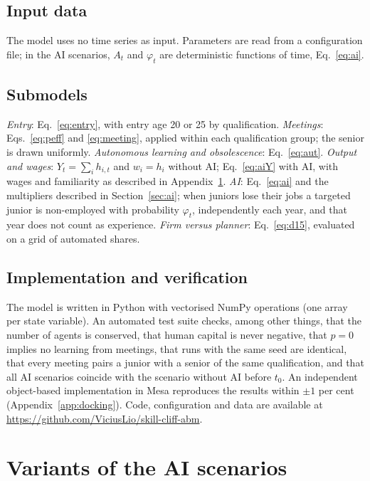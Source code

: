 \documentclass[preprint,12pt,authoryear]{elsarticle}
\begin{document}
\subsection{Input data}
The model uses no time series as input. Parameters are read from a configuration file; in the AI scenarios, $A_t$ and $\varphi_t$ are deterministic functions of time, Eq.~\eqref{eq:ai}.

\subsection{Submodels}
\emph{Entry}: Eq.~\eqref{eq:entry}, with entry age 20 or 25 by qualification. \emph{Meetings}: Eqs.~\eqref{eq:peff} and \eqref{eq:meeting}, applied within each qualification group; the senior is drawn uniformly. \emph{Autonomous learning and obsolescence}: Eq.~\eqref{eq:aut}. \emph{Output and wages}: $Y_t=\sum_i h_{i,t}$ and $w_i=h_i$ without AI; Eq.~\eqref{eq:aiY} with AI, with wages and familiarity as described in Appendix~\ref{app:variants}. \emph{AI}: Eq.~\eqref{eq:ai} and the multipliers described in Section~\ref{sec:ai}; when juniors lose their jobs a targeted junior is non-employed with probability $\varphi_t$, independently each year, and that year does not count as experience. \emph{Firm versus planner}: Eq.~\eqref{eq:d15}, evaluated on a grid of automated shares.

\subsection{Implementation and verification}
The model is written in Python with vectorised NumPy operations (one array per state variable). An automated test suite checks, among other things, that the number of agents is conserved, that human capital is never negative, that $p=0$ implies no learning from meetings, that runs with the same seed are identical, that every meeting pairs a junior with a senior of the same qualification, and that all AI scenarios coincide with the scenario without AI before $t_0$. An independent object-based implementation in Mesa reproduces the results within $\pm1$ per cent (Appendix~\ref{app:docking}). Code, configuration and data are available at \url{https://github.com/ViciusLio/skill-cliff-abm}.

\section{Variants of the AI scenarios}\label{app:variants}
\end{document}
